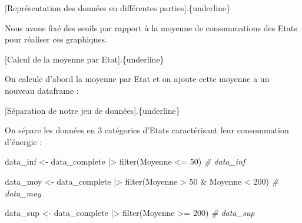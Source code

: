 \documentclass[
]{article}
\newenvironment{Shaded}{\begin{snugshade}}{\end{snugshade}}
\newcommand{\AttributeTok}[1]{\textcolor[rgb]{0.77,0.63,0.00}{#1}}
\newcommand{\CommentTok}[1]{\textcolor[rgb]{0.56,0.35,0.01}{\textit{#1}}}
\newcommand{\DecValTok}[1]{\textcolor[rgb]{0.00,0.00,0.81}{#1}}
\newcommand{\FunctionTok}[1]{\textcolor[rgb]{0.00,0.00,0.00}{#1}}
\newcommand{\NormalTok}[1]{#1}
\newcommand{\OtherTok}[1]{\textcolor[rgb]{0.56,0.35,0.01}{#1}}
\newcommand{\SpecialCharTok}[1]{\textcolor[rgb]{0.00,0.00,0.00}{#1}}
\newcommand{\StringTok}[1]{\textcolor[rgb]{0.31,0.60,0.02}{#1}}
\begin{document}
{[}Représentation des données en différentes parties{]}.\{underline\}

Nous avons fixé des seuils par rapport à la moyenne de consommations des
Etats pour réaliser ces graphiques.

{[}Calcul de la moyenne par Etat{]}.\{underline\}

On calcule d'abord la moyenne par Etat et on ajoute cette moyenne a un
nouveau dataframe :

\begin{Shaded}
\end{Shaded}

{[}Séparation de notre jeu de données{]}.\{underline\}

On sépare les données en 3 catégories d'Etats caractérisant leur
consommation d'énergie :

\begin{Shaded}
\begin{Highlighting}[]
\NormalTok{data\_inf }\OtherTok{\textless{}{-}}\NormalTok{ data\_complete }\SpecialCharTok{|\textgreater{}} 
  \FunctionTok{filter}\NormalTok{(Moyenne }\SpecialCharTok{\textless{}=} \DecValTok{50}\NormalTok{)}
\CommentTok{\# data\_inf}

\NormalTok{data\_moy }\OtherTok{\textless{}{-}}\NormalTok{ data\_complete }\SpecialCharTok{|\textgreater{}} 
  \FunctionTok{filter}\NormalTok{(Moyenne }\SpecialCharTok{\textgreater{}} \DecValTok{50} \SpecialCharTok{\&}\NormalTok{ Moyenne }\SpecialCharTok{\textless{}} \DecValTok{200}\NormalTok{)}
\CommentTok{\# data\_moy}

\NormalTok{data\_sup }\OtherTok{\textless{}{-}}\NormalTok{ data\_complete }\SpecialCharTok{|\textgreater{}} 
  \FunctionTok{filter}\NormalTok{(Moyenne }\SpecialCharTok{\textgreater{}=} \DecValTok{200}\NormalTok{)}
\CommentTok{\# data\_sup}
\end{Highlighting}
\end{Shaded}
\end{document}

